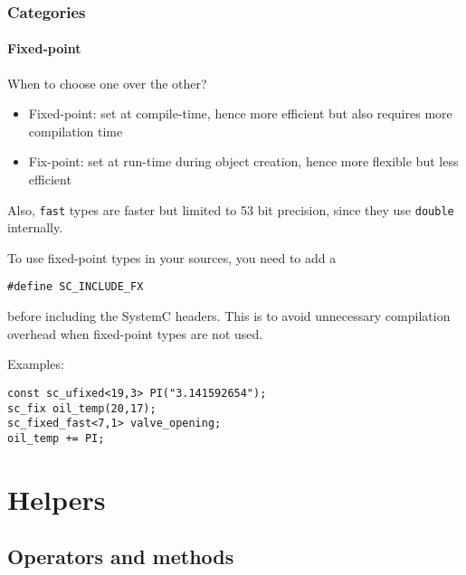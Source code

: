 \begin{frame}[fragile]
\frametitle{Categories}
\framesubtitle{Fixed-point}
{\scriptsize
\begin{block}{When to choose one over the other?}
\begin{itemize}
\item Fixed-point: set at compile-time, hence more efficient but also requires more compilation time
\item Fix-point: set at run-time during object creation, hence more flexible but less efficient
\end{itemize}
Also, \texttt{fast} types are faster but limited to 53 bit precision, since they use \texttt{double} internally.

\pause
\medskip
To use fixed-point types in your sources, you need to add a 

\medskip
\texttt{\#define SC\_INCLUDE\_FX}

\medskip
before including the SystemC headers. This is to avoid unnecessary compilation overhead when fixed-point types are not used.
\end{block}
\pause
\begin{block}{Examples:} 
\vspace{-1em}
\begin{verbatim}
const sc_ufixed<19,3> PI("3.141592654");
sc_fix oil_temp(20,17);
sc_fixed_fast<7,1> valve_opening;
oil_temp += PI;
\end{verbatim}
\vspace{-1em}
\end{block}
}
\end{frame}

\section{Helpers}

\subsection{Operators and methods}

